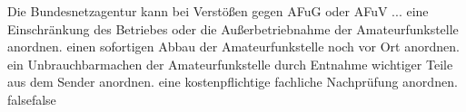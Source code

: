     {Die Bundesnetzagentur kann bei Verstößen gegen AFuG oder AFuV ...}
    {eine Einschränkung des Betriebes oder die Außerbetriebnahme der Amateurfunkstelle anordnen.}
    {einen sofortigen Abbau der Amateurfunkstelle noch vor Ort anordnen.}
    {ein Unbrauchbarmachen der Amateurfunkstelle durch Entnahme wichtiger Teile aus dem Sender anordnen.}
    {eine kostenpflichtige fachliche Nachprüfung anordnen.}
    {false}{false}